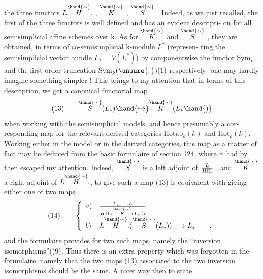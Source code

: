 
the three functors $L\overset{\hand{\sim}}{H}.$ , $\overset{\hand{\sim}}{K}$ , $\overset{\hand{\sim}}{S}$ . Indeed, as we just recalled, the
first of the three functors is well defined and has an evident descripti-%
on for all semisimplicial affine schemes over k. As for $\overset{\hand{\sim}}{K}$ and $\overset{\hand{\sim}}{S}$ ,
they are obtained, in terms of  co-semisimplicial k-module $L^*$ (represen-%
ting the semisimplicial vector bundle  $L_* = V(L^*)$) by  
componentwise the functor $\mathrm{Sym}_k$ and the first-order truncation
$\mathrm{Sym}_k(\unsure{;})(1)$ respectively\xout{\unsure{,}}- one may hardly imagine something simpler !
This brings to my attention that in terms of this description, we get
a canonical functorial map
\[
(13)\qquad \overset{\hand{\sim}}{S}(L_*)\hand{\hookrightarrow}\overset{\hand{\sim}}{K}(L_*\hand{)}
\]
when working with the semisimplicial models, and hence presumably a cor-%
responding map for the  relevant derived categories $\mathrm{Hotab}_o(k)$ and $\mathrm{Hot}_o(k)$.
Working either in the model or in the derived categories, this map as
a matter of fact may be deduced from the basic formulaire of section
124, where it had by then escaped my attention. Indeed,  $\overset{\hand{\sim}}{S}$ is a
left adjoint of $L\over{H}{\Pi}.$ , and $\overset{\hand{\sim}}{K}$ a right adjoint of $L\overset{\hand{\sim}}{H}.$, to give such
a map (13) is equivalent with giving either one of two maps
\[
(14)\qquad \left\{
\begin{array}{ll}
a) & L_* \longrightarrow L\over{H}{\Pi}.(\overset{\hand{\sim}}{K}(L_*))\\
b) & L\overset{\hand{\sim}}{H}.(\overset{\hand{\sim}}{S}(L_*)) \longrightarrow L_* \qquad ,
\end{array}\right.
\]
and the formulaire provides for two such maps, namely the ``inversion
isomorphisms''((9),  Thus there is an extra property which was forgotten
in the formulaire, namely that the two maps (13) associated to the two
inversion isomorphisms should be the same. A nicer way then to state

